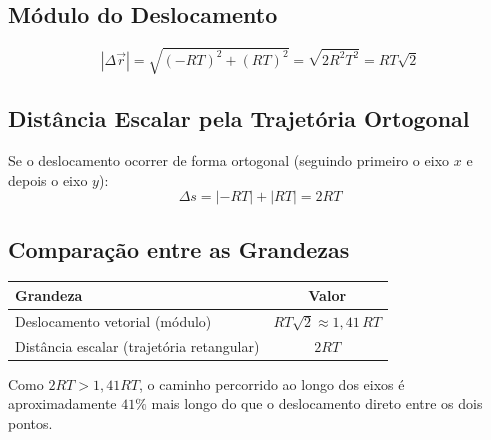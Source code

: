 \documentclass[10.5pt, a4paper]{extarticle}
\begin{document}
\subsection{Módulo do Deslocamento}

\[
  |\Delta\vec{r}| = \sqrt{(-RT)^2 + (RT)^2} = \sqrt{2R^2T^2} = RT\sqrt{2}
\]

\subsection{Distância Escalar pela Trajetória Ortogonal}

Se o deslocamento ocorrer de forma ortogonal (seguindo primeiro o eixo $x$ e depois o eixo $y$):
\[
  \Delta s = |-RT| + |RT| = 2RT
\]

\subsection{Comparação entre as Grandezas}

\begin{center}
\renewcommand{\arraystretch}{1.4}
\begin{tabular}{|l|c|}
\hline
\textbf{\color{pokered}Grandeza} & \textbf{\color{pokered}Valor} \\
\hline
\color{pokeblue}Deslocamento vetorial (módulo) & $RT\sqrt{2} \approx 1{,}41\,RT$ \\
\hline
\color{pokeblue}Distância escalar (trajetória retangular) & $2RT$ \\
\hline
\end{tabular}
\end{center}

Como $2RT > 1{,}41RT$, o caminho percorrido ao longo dos eixos é aproximadamente $41\%$ mais longo do que o deslocamento direto entre os dois pontos.

\begin{center}
\end{center}

\end{document}
